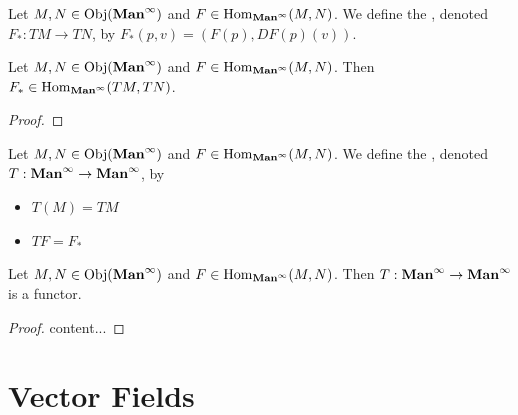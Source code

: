 \documentclass{book}
\begin{document}
\begin{defn}
	Let $M,N \in \Obj(\bManinf)$ and $F \in \Hom_{\bManinf}(M,N)$. We define the , denoted $F_*:TM \rightarrow TN$, by $F_*(p, v) = (F(p), DF(p)(v))$. 
\end{defn}

\begin{ex}
	Let $M,N \in \Obj(\bManinf)$ and $F \in \Hom_{\bManinf}(M,N)$. Then $F_* \in \Hom_{\bManinf}(TM, TN)$.
\end{ex}

\begin{proof}
	
\end{proof}

\begin{defn}
	Let $M,N \in \Obj(\bManinf)$ and $F \in \Hom_{\bManinf}(M,N)$. We define the , denoted $T: \bManinf \rightarrow \bManinf$, by 
	\begin{itemize}
		\item $T(M) = TM$
		\item $TF = F_*$ 
	\end{itemize}
\end{defn}

\begin{ex}
	Let $M,N \in \Obj(\bManinf)$ and $F \in \Hom_{\bManinf}(M,N)$. Then $T: \bManinf \rightarrow \bManinf$ is a functor.
\end{ex}

\begin{proof}
	content...
\end{proof}

















\section{Vector Fields}
\end{document}
